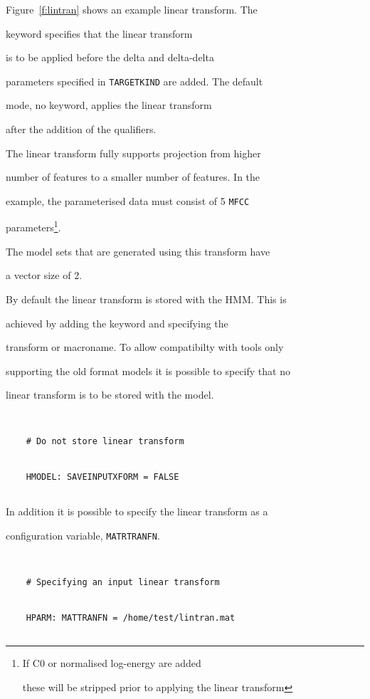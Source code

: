 Figure~\ref{f:lintran}  shows an example linear transform. The


 keyword specifies that the linear transform


is to be applied before the delta and delta-delta


parameters specified in \texttt{TARGETKIND} are added. The default


mode, no  keyword, applies the linear transform 


after the addition of the qualifiers.





The linear transform fully supports projection from higher 


number of features to a smaller number of features. In the 


example, the parameterised data must consist of 5 \texttt{MFCC}


parameters\footnote{If C0 or normalised log-energy are added


these will be stripped prior to applying the linear transform}.


The model sets that are generated using this transform have


a vector size of 2.





By default the linear transform is stored with the HMM. This is


achieved by adding the  keyword and specifying the


transform or macroname. To allow compatibilty with tools only


supporting the old format models it is possible to specify that no


linear transform is to be stored with the model. 


\begin{verbatim}


    # Do not store linear transform


    HMODEL: SAVEINPUTXFORM = FALSE


\end{verbatim}


In addition it is possible to specify the linear transform as a


 configuration variable, \texttt{MATRTRANFN}.


\begin{verbatim}


    # Specifying an input linear transform


    HPARM: MATTRANFN = /home/test/lintran.mat


\end{verbatim}


